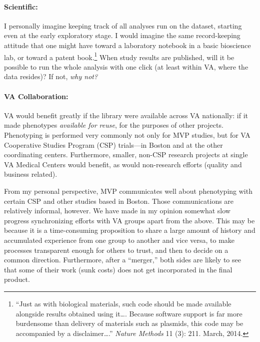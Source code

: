 \documentclass{tufte-handout}
\begin{document}
\paragraph{Scientific:}
I personally imagine keeping track of all analyses run on the dataset,
starting even at the early exploratory stage. I would imagine the same
record-keeping attitude that one might have toward a laboratory
notebook in a basic bioscience lab, or toward a patent
book.\footnote{``Just as with biological materials, such code should
  be made available alongside results obtained using it\ldots{}.
  Because software support is far more burdensome than delivery of
  materials such as plasmids, this code may be accompanied by a
  disclaimer\ldots{}.'' \emph{Nature Methods} 11 (3): 211. March,
  2014.} When study results are published, will it be possible to run
the whole analysis with one click (at least within VA, where the data
resides)? If not, \emph{why not?}

\paragraph{VA Collaboration:}
VA would benefit greatly if the library were available across VA
nationally: if it made phenotypes \emph{available for reuse}, for the
purposes of other projects. Phenotyping is performed very commonly not
only for MVP studies, but for VA Cooperative Studies Program (CSP)
trials---in Boston and at the other coordinating centers. Furthermore,
smaller, non-CSP research projects at single VA Medical Centers would
benefit, as would non-research efforts (quality and business related).

From my personal perspective, MVP communicates well about phenotyping
with certain CSP and other studies based in Boston. Those
communications are relatively informal, however. We have made in my
opinion somewhat slow progress synchronizing efforts with VA groups
apart from the above. This may be because it is a time-consuming
proposition to share a large amount of history and accumulated
experience from one group to another and vice versa, to make processes
transparent enough for others to trust, and then to decide on a common
direction. Furthermore, after a ``merger,'' both sides are likely to
see that some of their work (sunk costs) does not get incorporated in
the final product.
\end{document}
